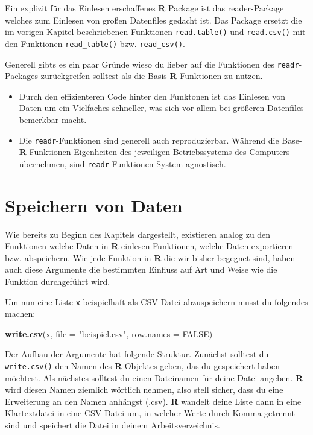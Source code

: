 \documentclass[
]{book}
\newenvironment{Shaded}{\begin{snugshade}}{\end{snugshade}}
\newcommand{\DataTypeTok}[1]{\textcolor[rgb]{0.13,0.29,0.53}{#1}}
\newcommand{\KeywordTok}[1]{\textcolor[rgb]{0.13,0.29,0.53}{\textbf{#1}}}
\newcommand{\NormalTok}[1]{#1}
\newcommand{\OtherTok}[1]{\textcolor[rgb]{0.56,0.35,0.01}{#1}}
\newcommand{\StringTok}[1]{\textcolor[rgb]{0.31,0.60,0.02}{#1}}
\providecommand{\tightlist}{%
  \setlength{\itemsep}{0pt}\setlength{\parskip}{0pt}}
\begin{document}
Ein explizit für das Einlesen erschaffenes \textbf{R} Package ist das reader-Package welches zum Einlesen von großen Datenfiles gedacht ist.
Das Package ersetzt die im vorigen Kapitel beschriebenen Funktionen
\texttt{read.table()} und \texttt{read.csv()} mit den Funktionen \texttt{read\_table()} bzw. \texttt{read\_csv()}.

Generell gibts es ein paar Gründe wieso du lieber auf die Funktionen des \texttt{readr}-Packages zurückgreifen solltest als die Basis-\textbf{R} Funktionen zu nutzen.

\begin{itemize}
\tightlist
\item
  Durch den effizienteren Code hinter den Funktonen ist das Einlesen von Daten um ein Vielfaches schneller, was sich vor allem bei größeren Datenfiles bemerkbar macht.
\item
  Die \texttt{readr}-Funktionen sind generell auch reproduzierbar. Während die Base-\textbf{R} Funktionen Eigenheiten des jeweiligen Betriebssystems des Computers übernehmen, sind \texttt{readr}-Funktionen System-agnostisch.
\end{itemize}

\hypertarget{speichern-von-daten}{%
\section{Speichern von Daten}\label{speichern-von-daten}}

Wie bereits zu Beginn des Kapitels dargestellt, existieren analog zu den Funktionen welche Daten in \textbf{R} einlesen Funktionen, welche Daten exportieren bzw. abspeichern. Wie jede Funktion in \textbf{R} die wir bisher begegnet sind, haben auch diese Argumente die bestimmten Einfluss auf Art und Weise wie die Funktion durchgeführt wird.

Um nun eine Liste \texttt{x} beispielhaft als CSV-Datei abzuspeichern musst du folgendes machen:

\begin{Shaded}
\begin{Highlighting}[]
\KeywordTok{write.csv}\NormalTok{(x, }\DataTypeTok{file =} \StringTok{"beispiel.csv"}\NormalTok{, }\DataTypeTok{row.names =} \OtherTok{FALSE}\NormalTok{)}
\end{Highlighting}
\end{Shaded}

Der Aufbau der Argumente hat folgende Struktur. Zunächst solltest du \texttt{write.csv()} den Namen des \textbf{R}-Objektes geben, das du gespeichert haben möchtest.
Als nächstes solltest du einen Dateinamen für deine Datei angeben. \textbf{R} wird diesen Namen ziemlich wörtlich nehmen, also stell sicher, dass du eine Erweiterung an den Namen anhängst (.csv).
\textbf{R} wandelt deine Liste dann in eine Klartextdatei in eine CSV-Datei um, in welcher Werte durch Komma getrennt sind und speichert die Datei in deinem Arbeitsverzeichnis.
\end{document}
